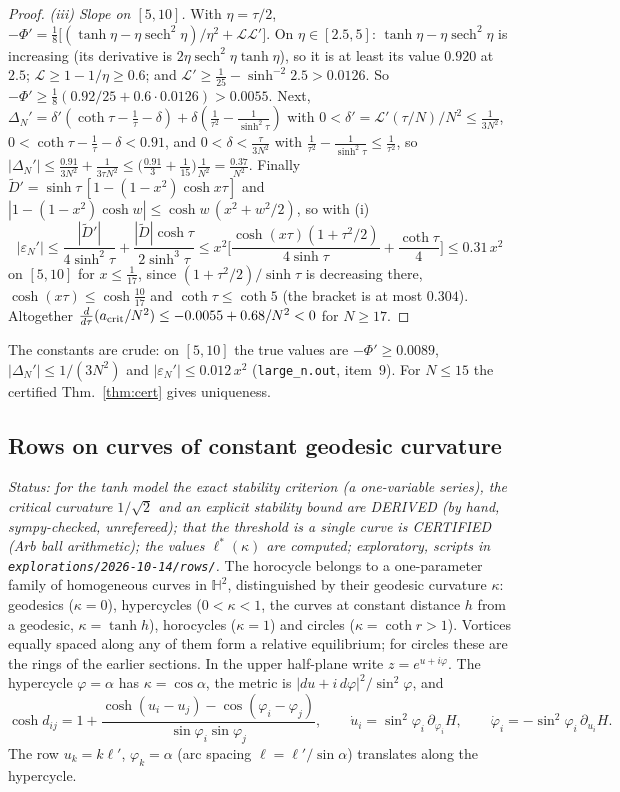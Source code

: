 \documentclass[11pt]{article}
\theoremstyle{remark}
\begin{document}
\begin{proof}
\emph{(iii) Slope on $[5,10]$.} With $\eta=\tau/2$, $-\Phi'=\frac18\big[(\tanh\eta-\eta\operatorname{sech}^2\eta)/\eta^2+\mathcal L\mathcal L'\big]$.
On $\eta\in[2.5,5]$: $\tanh\eta-\eta\operatorname{sech}^2\eta$ is increasing (its derivative is
$2\eta\operatorname{sech}^2\eta\tanh\eta$), so it is at least its value $0.920$ at $2.5$; $\mathcal L\ge1-1/\eta\ge0.6$; and
$\mathcal L'\ge\frac1{25}-\sinh^{-2}2.5>0.0126$. So $-\Phi'\ge\frac18(0.92/25+0.6\cdot0.0126)>0.0055$. Next,
$\Delta_N'=\delta'(\coth\tau-\frac1\tau-\delta)+\delta(\frac1{\tau^2}-\frac1{\sinh^2\tau})$ with $0<\delta'=\mathcal L'(\tau/N)/N^2\le\frac1{3N^2}$,
$0<\coth\tau-\frac1\tau-\delta<0.91$, and $0<\delta<\frac\tau{3N^2}$ with $\frac1{\tau^2}-\frac1{\sinh^2\tau}\le\frac1{\tau^2}$, so
$|\Delta_N'|\le\frac{0.91}{3N^2}+\frac1{3\tau N^2}\le\big(\frac{0.91}3+\frac1{15}\big)\frac1{N^2}=\frac{0.37}{N^2}$. Finally
$\tilde D'=\sinh\tau\,[1-(1-x^2)\cosh x\tau]$ and $|1-(1-x^2)\cosh w|\le\cosh w\,(x^2+w^2/2)$, so with (i)
\[
|\varepsilon_N'|\le\frac{|\tilde D'|}{4\sinh^2\tau}+\frac{|\tilde D|\cosh\tau}{2\sinh^3\tau}
\le x^2\Big[\frac{\cosh(x\tau)(1+\tau^2/2)}{4\sinh\tau}+\frac{\coth\tau}4\Big]\le0.31\,x^2
\]
on $[5,10]$ for $x\le\frac1{17}$, since $(1+\tau^2/2)/\sinh\tau$ is decreasing there, $\cosh(x\tau)\le\cosh\frac{10}{17}$ and
$\coth\tau\le\coth5$ (the bracket is at most $0.304$). Altogether $\frac d{d\tau}(a_{\rm crit}/N^2)\le-0.0055+0.68/N^2<0$ for
$N\ge17$.
\end{proof}
The constants are crude: on $[5,10]$ the true values are $-\Phi'\ge0.0089$, $|\Delta_N'|\le1/(3N^2)$ and
$|\varepsilon_N'|\le0.012\,x^2$ (\texttt{large\_n.out}, item~9). For $N\le15$ the certified Thm.~\ref{thm:cert} gives uniqueness.

\subsection*{Rows on curves of constant geodesic curvature}
\emph{Status: for the tanh model the exact stability criterion (a one-variable series), the critical curvature
$1/\sqrt2$ and an explicit stability bound are DERIVED (by hand, sympy-checked, unrefereed); that the threshold is a single
curve is CERTIFIED (Arb ball arithmetic); the values $\ell^*(\kappa)$ are computed; exploratory, scripts in
\texttt{explorations/2026-10-14/rows/}.} The horocycle belongs to a one-parameter family of homogeneous curves in
$\mathbb H^2$, distinguished by their geodesic curvature $\kappa$: geodesics ($\kappa=0$), hypercycles ($0<\kappa<1$, the
curves at constant distance $h$ from a geodesic, $\kappa=\tanh h$), horocycles ($\kappa=1$) and circles ($\kappa=\coth r>1$).
Vortices equally spaced along any of them form a relative equilibrium; for circles these are the rings of the earlier
sections. In the upper half-plane write $z=e^{u+i\varphi}$. The hypercycle $\varphi=\alpha$ has $\kappa=\cos\alpha$, the metric
is $|du+i\,d\varphi|^2/\sin^2\varphi$, and
\[
\cosh d_{ij}=1+\frac{\cosh(u_i-u_j)-\cos(\varphi_i-\varphi_j)}{\sin\varphi_i\sin\varphi_j},\qquad
\dot u_i=\sin^2\varphi_i\,\partial_{\varphi_i}H,\qquad \dot\varphi_i=-\sin^2\varphi_i\,\partial_{u_i}H .
\]
The row $u_k=k\ell'$, $\varphi_k=\alpha$ (arc spacing $\ell=\ell'/\sin\alpha$) translates along the hypercycle.
\end{document}
